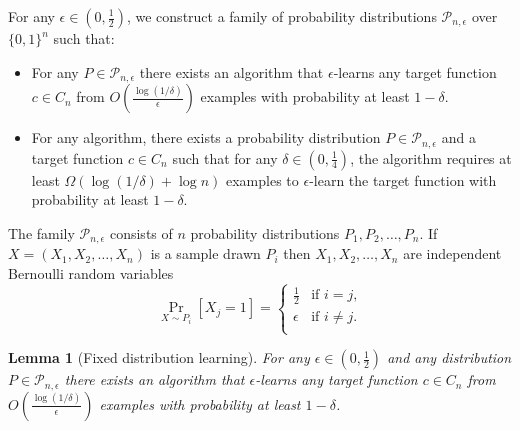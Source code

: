 \documentclass[12pt]{article}
\newtheorem{lemma}[proposition]{Lemma}
\renewcommand{\P}{\mathcal{P}}
\begin{document}
For any $\epsilon \in (0,\frac{1}{2})$,
we construct a family of probability distributions $\P_{n,\epsilon}$ over $\{0,1\}^n$ such that:
\begin{itemize}
\item For any $P \in \P_{n,\epsilon}$ there exists an algorithm that $\epsilon$-learns
any target function $c \in C_n$ from $O \left( \frac{\log(1/\delta)}{\epsilon} \right)$ examples
with probability at least $1-\delta$.
\item For any algorithm, there exists
a probability distribution $P \in \P_{n,\epsilon}$ and a target function $c \in C_n$
such that for any $\delta \in (0,\frac{1}{4})$, the algorithm requires
at least $\Omega(\log(1/\delta) + \log n)$ examples to $\epsilon$-learn
the target function with probability at least $1-\delta$.
\end{itemize}

The family $\P_{n,\epsilon}$ consists of $n$ probability distributions $P_1, P_2, \dots, P_n$.
If $X = (X_1, X_2, \dots, X_n)$ is a sample drawn $P_i$ then $X_1, X_2, \dots, X_n$
are independent Bernoulli random variables
$$
\Pr_{X \sim P_i}[X_j = 1] =
\begin{cases}
\frac{1}{2} & \text{if $i = j$,} \\
\epsilon & \text{if $i \neq j$.} \\
\end{cases}
$$

\begin{lemma}[Fixed distribution learning]
For any $\epsilon \in (0,\frac{1}{2})$ and any distribution $P \in
\P_{n,\epsilon}$ there exists an algorithm that $\epsilon$-learns any target
function $c \in C_n$ from $O \left( \frac{\log(1/\delta)}{\epsilon} \right)$
examples with probability at least $1 - \delta$.
\end{lemma}
\end{document}
